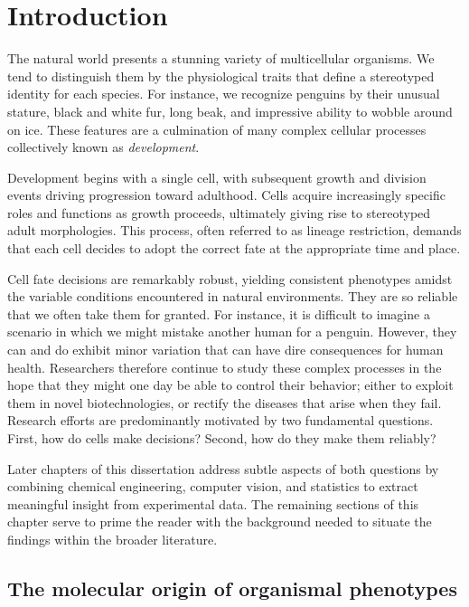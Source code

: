 \chapter{Introduction}

The natural world presents a stunning variety of multicellular organisms. We tend to distinguish them by the physiological traits that define a stereotyped identity for each species. For instance, we recognize penguins by their unusual stature, black and white fur, long beak, and impressive ability to wobble around on ice. These features are a culmination of many complex cellular processes collectively known as \emph{development}.

Development begins with a single cell, with subsequent growth and division events driving progression toward adulthood. Cells acquire increasingly specific roles and functions as growth proceeds, ultimately giving rise to stereotyped adult morphologies. This process, often referred to as lineage restriction, demands that each cell decides to adopt the correct fate at the appropriate time and place.

Cell fate decisions are remarkably robust, yielding consistent phenotypes amidst the variable conditions encountered in natural environments. They are so reliable that we often take them for granted. For instance, it is difficult to imagine a scenario in which we might mistake another human for a penguin. However, they can and do exhibit minor variation that can have dire consequences for human health. Researchers therefore continue to study these complex processes in the hope that they might one day be able to control their behavior; either to exploit them in novel biotechnologies, or rectify the diseases that arise when they fail. Research efforts are predominantly motivated by two fundamental questions. First, how do cells make decisions? Second, how do they make them reliably? 

Later chapters of this dissertation address subtle aspects of both questions by combining chemical engineering, computer vision, and statistics to extract meaningful insight from experimental data. The remaining sections of this chapter serve to prime the reader with the background needed to situate the findings within the broader literature. 

\section{The molecular origin of organismal phenotypes}

